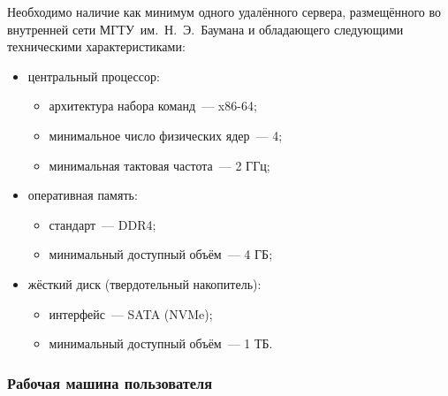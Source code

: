 \documentclass{bmstu}
\begin{document}
  Необходимо наличие как минимум одного удалённого сервера,
  размещённого во внутренней сети МГТУ~им.~Н.~Э.~Баумана и обладающего
  следующими техническими характеристиками:
  \begin{itemize}[label=---]
    \item центральный процессор:
      \begin{itemize}[label=---]
        \item архитектура набора команд~--- x86-64;
        \item минимальное число физических ядер~--- 4;
        \item минимальная тактовая частота~--- 2 ГГц;
      \end{itemize}
    \item оперативная память:
      \begin{itemize}[label=---]
        \item стандарт~--- DDR4;
        \item минимальный доступный объём~--- 4 ГБ;
      \end{itemize}
    \item жёсткий диск (твердотельный накопитель):
      \begin{itemize}[label=---]
        \item интерфейс~--- SATA (NVMe);
        \item минимальный доступный объём~--- 1 ТБ.
      \end{itemize}
  \end{itemize}

  \subsubsection{Рабочая машина пользователя}
\end{document}
